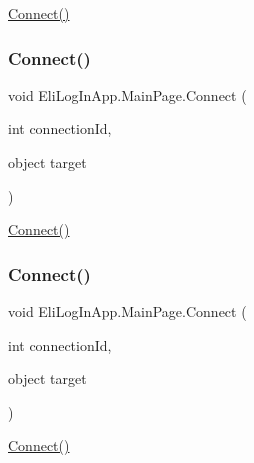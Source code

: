 \hyperlink{class_eli_log_in_app_1_1_main_page_a91b51a574c226bfbec61f7deaba558e9}{Connect()} 

\mbox{\label{class_eli_log_in_app_1_1_main_page_a91b51a574c226bfbec61f7deaba558e9}} 
\subsubsection{\texorpdfstring{Connect()}{Connect()}\hspace{0.1cm}{\footnotesize\ttfamily [2/3]}}
{\footnotesize\ttfamily void Eli\+Log\+In\+App.\+Main\+Page.\+Connect (\begin{DoxyParamCaption}\item[{int}]{connection\+Id,  }\item[{object}]{target }\end{DoxyParamCaption})\hspace{0.3cm}{\ttfamily [inline]}}



\hyperlink{class_eli_log_in_app_1_1_main_page_a91b51a574c226bfbec61f7deaba558e9}{Connect()} 

\mbox{\label{class_eli_log_in_app_1_1_main_page_a91b51a574c226bfbec61f7deaba558e9}} 
\subsubsection{\texorpdfstring{Connect()}{Connect()}\hspace{0.1cm}{\footnotesize\ttfamily [3/3]}}
{\footnotesize\ttfamily void Eli\+Log\+In\+App.\+Main\+Page.\+Connect (\begin{DoxyParamCaption}\item[{int}]{connection\+Id,  }\item[{object}]{target }\end{DoxyParamCaption})\hspace{0.3cm}{\ttfamily [inline]}}



\hyperlink{class_eli_log_in_app_1_1_main_page_a91b51a574c226bfbec61f7deaba558e9}{Connect()} 

